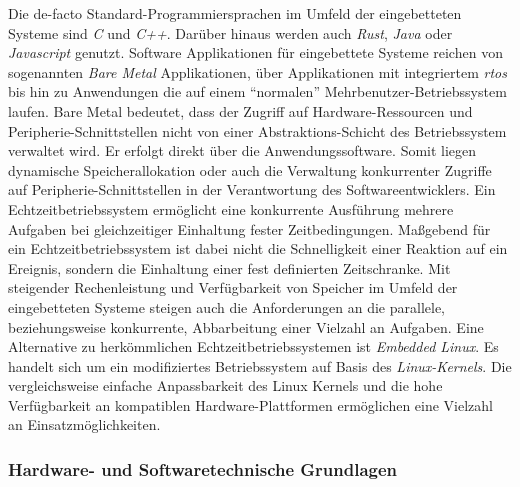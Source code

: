Die de-facto Standard-Programmiersprachen im Umfeld der eingebetteten Systeme
sind \textit{C} und \textit{C++}.
Darüber hinaus werden auch \textit{Rust}, \textit{Java} oder
\textit{Javascript} genutzt.
\newline
Software Applikationen für eingebettete Systeme reichen von sogenannten
\textit{Bare Metal} Applikationen, über Applikationen mit integriertem
\textit{\ac{rtos}} bis hin zu Anwendungen die auf einem \enquote{normalen}
Mehrbenutzer-Betriebssystem laufen.
\newline
Bare Metal bedeutet, dass der Zugriff auf Hardware-Ressourcen und
Peripherie-Schnittstellen nicht von einer Abstraktions-Schicht des
Betriebssystem verwaltet wird.
Er erfolgt direkt über die Anwendungssoftware.
Somit liegen dynamische Speicherallokation oder auch die Verwaltung
konkurrenter Zugriffe auf Peripherie-Schnittstellen in der Verantwortung des
Softwareentwicklers.
\newline
Ein Echtzeitbetriebssystem ermöglicht eine konkurrente Ausführung mehrere
Aufgaben bei gleichzeitiger Einhaltung fester Zeitbedingungen.
Maßgebend für ein Echtzeitbetriebssystem ist dabei nicht die Schnelligkeit
einer Reaktion auf ein Ereignis, sondern die Einhaltung einer fest definierten
Zeitschranke\footnotemark[1]\cite{BSKompakt_GrundlagenBs}.
\newline
Mit steigender Rechenleistung und Verfügbarkeit von Speicher im Umfeld der
eingebetteten Systeme steigen auch die Anforderungen an die parallele,
beziehungsweise konkurrente, Abbarbeitung einer Vielzahl an Aufgaben.
Eine Alternative zu herkömmlichen Echtzeitbetriebssystemen ist \textit{Embedded
Linux}.
Es handelt sich um ein modifiziertes Betriebssystem auf Basis des
\textit{Linux-Kernels}.
Die vergleichsweise einfache Anpassbarkeit des Linux Kernels und die hohe
Verfügbarkeit an kompatiblen Hardware-Plattformen ermöglichen eine Vielzahl an
Einsatzmöglichkeiten\cite{UbuntuBlogEmbeddedLinux}.

\subsubsection{Hardware- und Softwaretechnische Grundlagen}
\label{sec:theo-basics-stb}

